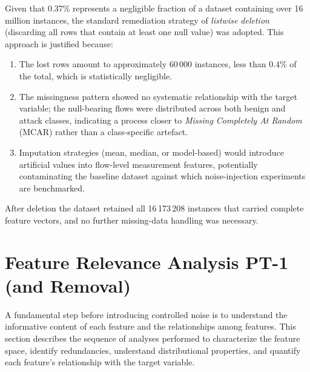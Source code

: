 \documentclass[../main.tex]{subfiles}
\begin{document}
Given that 0.37\% represents a negligible fraction of a dataset containing over 16 million instances, the standard remediation strategy of \emph{listwise deletion} (discarding all rows that contain at least one null value) was adopted.  This approach is justified because:

\begin{enumerate}
  \item The lost rows amount to approximately 60\,000 instances, less than 0.4\% of the total, which is statistically negligible.
  \item The missingness pattern showed no systematic relationship with the target variable; the null-bearing flows were distributed across both benign and attack classes, indicating a process closer to \emph{Missing Completely At Random} (MCAR) rather than a class-specific artefact.
  \item Imputation strategies (mean, median, or model-based) would introduce artificial values into flow-level measurement features, potentially contaminating the baseline dataset against which noise-injection experiments are benchmarked.
\end{enumerate}

After deletion the dataset retained all 16\,173\,208 instances that carried complete feature vectors, and no further missing-data handling was necessary.

\newpage
\section{Feature Relevance Analysis PT-1 (and Removal)}
\label{sec:feature-relevance}

A fundamental step before introducing controlled noise is to understand the informative content of each feature and the relationships among features. This section describes the sequence of analyses performed to characterize the feature space, identify redundancies, understand distributional properties, and quantify each feature's relationship with the target variable.
\end{document}

